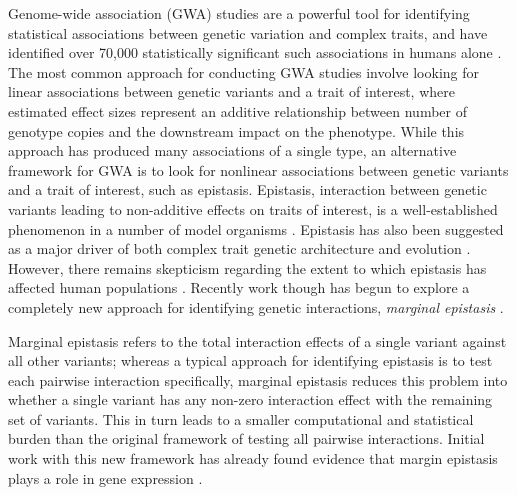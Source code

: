 \documentclass[12pt,a4paper]{article}
\begin{document}
Genome-wide association (GWA) studies are a powerful tool for identifying statistical associations between genetic variation and complex traits, and have identified over 70,000 statistically significant such associations in humans alone \citep{Buniello2019}. The most common approach for conducting GWA studies involve looking for linear associations between genetic variants and a trait of interest, where estimated effect sizes represent an additive relationship between number of genotype copies and the downstream impact on the phenotype. While this approach has produced many associations of a single type, an alternative framework for GWA is to look for nonlinear associations between genetic variants and a trait of interest, such as epistasis. Epistasis, interaction between genetic variants leading to non-additive effects on traits of interest, is a well-established phenomenon in a number of model organisms \citep{Lehner2006,Rowe2008,Shao2008,Flint2009,Costanzo2010,He2010,Jarvis2011,Pettersson2011,Bloom2013,Monnahan2015}. Epistasis has also been suggested as a major driver of both complex trait genetic architecture and evolution \citep{Carlborg2004,Carlborg2006,Martin2007,Phillips2008,Moore2009,Zuk2012,Jones2014,Mackay2014}. However, there remains skepticism regarding the extent to which epistasis has affected human populations \citep{Hill2008,Crow2010,Aschard2012,Wood2014,Yang2015}. Recently work though has begun to explore a completely new approach for identifying genetic interactions, \textit{marginal epistasis} \citep{Crawford2017a}.


Marginal epistasis refers to the total interaction effects of a single variant against all other variants; whereas a typical approach for identifying epistasis is to test each pairwise interaction specifically, marginal epistasis reduces this problem into whether a single variant has any non-zero interaction effect with the remaining set of variants. This in turn leads to a smaller computational and statistical burden than the original framework of testing all pairwise interactions. Initial work with this new framework has already found evidence that margin epistasis plays a role in gene expression \citep{Crawford2017a}. 
\end{document}
